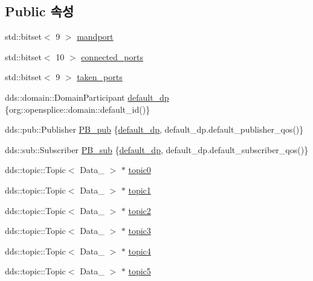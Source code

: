 \subsection*{Public 속성}
\begin{DoxyCompactItemize}
\item 
std\+::bitset$<$ 9 $>$ \hyperlink{classFusion__operator_a1b0feb66d902358293e42a9cea02b5f7}{mandport}
\item 
std\+::bitset$<$ 10 $>$ \hyperlink{classFusion__operator_a5d5904ab66f3b43ed107a5b3ef9d205b}{connected\+\_\+ports}
\item 
std\+::bitset$<$ 9 $>$ \hyperlink{classFusion__operator_a29bdb5e13d8f8adf00ffcfcbca60fcf4}{taken\+\_\+ports}
\item 
dds\+::domain\+::\+Domain\+Participant \hyperlink{classFusion__operator_ad3b3aafd9ed9aa55eb097656a97551bd}{default\+\_\+dp} \{org\+::opensplice\+::domain\+::default\+\_\+id()\}
\item 
dds\+::pub\+::\+Publisher \hyperlink{classFusion__operator_a121024c841142a5b50be10b19e94653e}{P\+B\+\_\+pub} \{\hyperlink{classFusion__operator_ad3b3aafd9ed9aa55eb097656a97551bd}{default\+\_\+dp}, default\+\_\+dp.\+default\+\_\+publisher\+\_\+qos()\}
\item 
dds\+::sub\+::\+Subscriber \hyperlink{classFusion__operator_aa22d9bbeb385dc5b1e31d85d65d63f28}{P\+B\+\_\+sub} \{\hyperlink{classFusion__operator_ad3b3aafd9ed9aa55eb097656a97551bd}{default\+\_\+dp}, default\+\_\+dp.\+default\+\_\+subscriber\+\_\+qos()\}
\item 
dds\+::topic\+::\+Topic$<$ Data\+\_ $>$ $\ast$ \hyperlink{classFusion__operator_a378e811778586da6619a1d6c2d1c5f37}{topic0}
\item 
dds\+::topic\+::\+Topic$<$ Data\+\_ $>$ $\ast$ \hyperlink{classFusion__operator_a79543a848dd9ac2cb01f9e38acf2b988}{topic1}
\item 
dds\+::topic\+::\+Topic$<$ Data\+\_ $>$ $\ast$ \hyperlink{classFusion__operator_a156ba17873325c431689c47f2f2d6296}{topic2}
\item 
dds\+::topic\+::\+Topic$<$ Data\+\_ $>$ $\ast$ \hyperlink{classFusion__operator_af90486f24e7f5e82364b20ad9d448595}{topic3}
\item 
dds\+::topic\+::\+Topic$<$ Data\+\_ $>$ $\ast$ \hyperlink{classFusion__operator_a2436ee57380c11e74b971df67d23c06a}{topic4}
\item 
dds\+::topic\+::\+Topic$<$ Data\+\_ $>$ $\ast$ \hyperlink{classFusion__operator_a610b159b6f22ca65f11d2db2c1b2124b}{topic5}
\item 

\end{DoxyCompactItemize}
